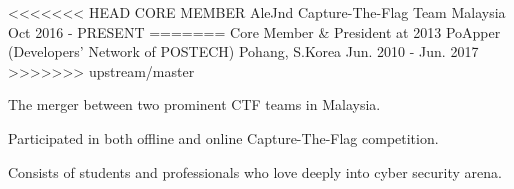 

\begin{cventries}

<<<<<<< HEAD
    \cventry
    {CORE MEMBER}
    {AleJnd Capture-The-Flag Team}
    {Malaysia}
    {Oct 2016 - PRESENT}
=======
  \cventry
    {Core Member \& President at 2013} %
    {PoApper (Developers' Network of POSTECH)} %
    {Pohang, S.Korea} %
    {Jun. 2010 - Jun. 2017} %
>>>>>>> upstream/master
    {
      \begin{cvitems}
        \item {The merger between two prominent CTF teams in Malaysia.}
        \item {Participated in both offline and online Capture-The-Flag competition.}
        \item {Consists of students and professionals who love deeply into cyber security arena.}
      \end{cvitems}
    }
\end{cventries}
